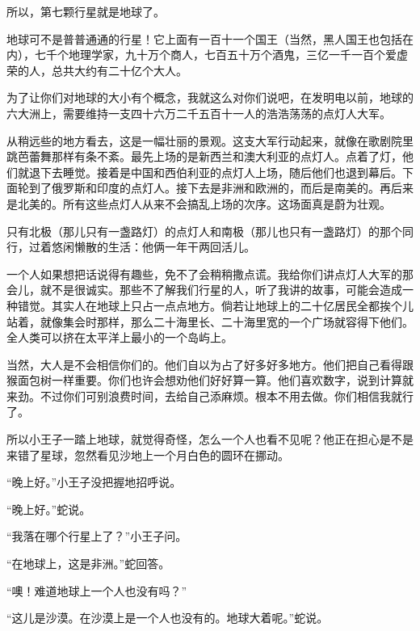 \stoptitle

\starttitle[title={16},reference={part0018.html_a019}]

所以，第七颗行星就是地球了。

地球可不是普普通通的行星！它上面有一百十一个国王（当然，黑人国王也包括在内），七千个地理学家，九十万个商人，七百五十万个酒鬼，三亿一千一百个爱虚荣的人，总共大约有二十亿个大人。

为了让你们对地球的大小有个概念，我就这么对你们说吧，在发明电以前，地球的六大洲上，需要维持一支四十六万二千五百十一人的浩浩荡荡的点灯人大军。

从稍远些的地方看去，这是一幅壮丽的景观。这支大军行动起来，就像在歌剧院里跳芭蕾舞那样有条不紊。最先上场的是新西兰和澳大利亚的点灯人。点着了灯，他们就退下去睡觉。接着是中国和西伯利亚的点灯人上场，随后他们也退到幕后。下面轮到了俄罗斯和印度的点灯人。接下去是非洲和欧洲的，而后是南美的。再后来是北美的。所有这些点灯人从来不会搞乱上场的次序。这场面真是蔚为壮观。

只有北极（那儿只有一盏路灯）的点灯人和南极（那儿也只有一盏路灯）的那个同行，过着悠闲懒散的生活：他俩一年干两回活儿。


\stoptitle

\starttitle[title={17},reference={part0019.html_a020}]

一个人如果想把话说得有趣些，免不了会稍稍撒点谎。我给你们讲点灯人大军的那会儿，就不是很诚实。那些不了解我们行星的人，听了我讲的故事，可能会造成一种错觉。其实人在地球上只占一点点地方。倘若让地球上的二十亿居民全都挨个儿站着，就像集会时那样，那么二十海里长、二十海里宽的一个广场就容得下他们。全人类可以挤在太平洋上最小的一个岛屿上。

当然，大人是不会相信你们的。他们自以为占了好多好多地方。他们把自己看得跟猴面包树一样重要。你们也许会想劝他们好好算一算。他们喜欢数字，说到计算就来劲。不过你们可别浪费时间，去给自己添麻烦。根本不用去做。你们相信我就行了。

所以小王子一踏上地球，就觉得奇怪，怎么一个人也看不见呢？他正在担心是不是来错了星球，忽然看见沙地上一个月白色的圆环在挪动。

“晚上好。”小王子没把握地招呼说。

“晚上好。”蛇说。

“我落在哪个行星上了？”小王子问。

“在地球上，这是非洲。”蛇回答。

“噢！难道地球上一个人也没有吗？”

“这儿是沙漠。在沙漠上是一个人也没有的。地球大着呢。”蛇说。

